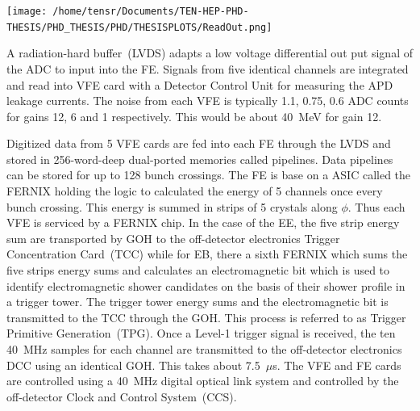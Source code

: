\begin{center}
\centering
\mbox{\texttt{[image: /home/tensr/Documents/TEN-HEP-PHD-THESIS/PHD\_THESIS/PHD/THESISPLOTS/ReadOut.png]}} 
\label{fig:readout}
\end{center}

A radiation-hard buffer~(LVDS) adapts a low voltage differential out put signal of the ADC to input into the FE. Signals from  five  identical channels are integrated and read into VFE card with a Detector Control Unit for measuring  the APD leakage currents. The noise from each VFE is typically 1.1, 0.75, 0.6 ADC counts for gains 12, 6 and 1 respectively. This would be about 40~MeV for gain 12.

Digitized data from 5 VFE cards are fed into each FE through the LVDS and stored in 256-word-deep dual-ported memories called pipelines. Data pipelines can be stored for up to 128 bunch crossings. The FE is base on a ASIC called the FERNIX holding the logic to calculated the energy of 5 channels once every bunch crossing. This energy is summed in strips of 5 crystals  along $\phi$. Thus each VFE is serviced by a FERNIX chip. In the case of the EE, the five strip energy sum are transported by GOH to the off-detector electronics Trigger Concentration Card~(TCC) while for EB, there a sixth FERNIX which sums the five strips energy sums  and calculates an electromagnetic bit which is used to identify electromagnetic shower candidates on the basis of their shower profile in a trigger tower. The trigger tower energy sums and the electromagnetic bit is transmitted to the TCC through the GOH. This process is referred to as Trigger Primitive Generation~(TPG). Once a Level-1 trigger signal is received, the ten 40~MHz samples for each channel are transmitted to the off-detector electronics DCC using an identical GOH. This takes about 7.5~$\mu$s. The VFE and FE cards are controlled using a 40~MHz digital optical link system and controlled by the off-detector Clock and Control System~(CCS). 
